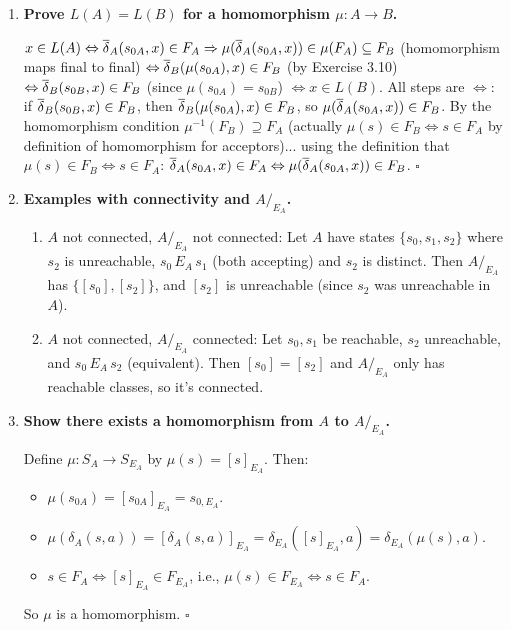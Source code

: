 \begin{enumerate}[{3.}1.]
\textit{Step}: $x=ya$. $\mu(\DBAR_A(s,ya))=\mu(\delta_A(\DBAR_A(s,y),a))=\delta_B(\mu(\DBAR_A(s,y)),a)$ (homomorphism property) $=\delta_B(\DBAR_B(\mu(s),y),a)$ (IH) $=\DBAR_B(\mu(s),ya)$. $\square$

\item \textbf{Prove $L(A)=L(B)$ for a homomorphism $\mu: A\to B$.}

$x\in L(A)\Leftrightarrow\overline{\delta}_A(s_{0A},x)\in F_A\Rightarrow\mu(\overline{\delta}_A(s_{0A},x))\in\mu(F_A)\subseteq F_B$ (homomorphism maps final to final) $\Leftrightarrow\overline{\delta}_B(\mu(s_{0A}),x)\in F_B$ (by Exercise 3.10) $\Leftrightarrow\overline{\delta}_B(s_{0B},x)\in F_B$ (since $\mu(s_{0A})=s_{0B}$) $\Leftrightarrow x\in L(B)$. All steps are $\Leftrightarrow$: if $\overline{\delta}_B(s_{0B},x)\in F_B$, then $\overline{\delta}_B(\mu(s_{0A}),x)\in F_B$, so $\mu(\overline{\delta}_A(s_{0A},x))\in F_B$. By the homomorphism condition $\mu^{-1}(F_B)\supseteq F_A$ (actually $\mu(s)\in F_B\Leftrightarrow s\in F_A$ by definition of homomorphism for acceptors)... using the definition that $\mu(s)\in F_B\Leftrightarrow s\in F_A$: $\overline{\delta}_A(s_{0A},x)\in F_A\Leftrightarrow\mu(\overline{\delta}_A(s_{0A},x))\in F_B$. $\square$

\item \textbf{Examples with connectivity and $A/_{E_A}$.}

\begin{enumerate}
\item $A$ not connected, $A/_{E_A}$ not connected: Let $A$ have states $\{s_0,s_1,s_2\}$ where $s_2$ is unreachable, $s_0\,E_A\,s_1$ (both accepting) and $s_2$ is distinct. Then $A/_{E_A}$ has $\{[s_0],[s_2]\}$, and $[s_2]$ is unreachable (since $s_2$ was unreachable in $A$).

\item $A$ not connected, $A/_{E_A}$ connected: Let $s_0,s_1$ be reachable, $s_2$ unreachable, and $s_0\,E_A\,s_2$ (equivalent). Then $[s_0]=[s_2]$ and $A/_{E_A}$ only has reachable classes, so it's connected.
\end{enumerate}

\item \textbf{Show there exists a homomorphism from $A$ to $A/_{E_A}$.}

Define $\mu: S_A\to S_{E_A}$ by $\mu(s)=[s]_{E_A}$. Then:
\begin{itemize}
\item $\mu(s_{0A})=[s_{0A}]_{E_A}=s_{0,E_A}$. \checkmark
\item $\mu(\delta_A(s,a))=[\delta_A(s,a)]_{E_A}=\delta_{E_A}([s]_{E_A},a)=\delta_{E_A}(\mu(s),a)$. \checkmark
\item $s\in F_A\Leftrightarrow[s]_{E_A}\in F_{E_A}$, i.e., $\mu(s)\in F_{E_A}\Leftrightarrow s\in F_A$. \checkmark
\end{itemize}
So $\mu$ is a homomorphism. $\square$


\end{enumerate}

